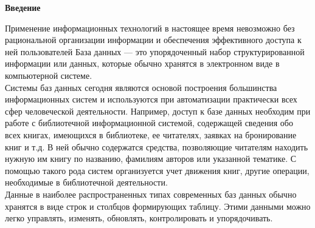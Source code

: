 \begin{flushleft}
    \setlength{\parindent}{14pt}
    \hspace*{10pt}
    \begin{center}
        \textbf{Введение}
    \end{center}
    \vspace*{14pt}

    Применение информационных технологий в настоящее время невозможно без рациональной 
    организации информации и обеспечения эффективного доступа к ней пользователей    
    База данных — это упорядоченный набор структурированной информации или данных, 
    которые обычно хранятся в электронном виде в компьютерной системе. \\

    Системы баз данных сегодня являются основой построения большинства информационных 
    систем и используются при автоматизации практически всех сфер человеческой деятельности. 
    Например, доступ к базе данных необходим при работе с библиотечной информационной
    системой, содержащей сведения обо всех книгах, имеющихся в библиотеке, ее читателях, 
    заявках на бронирование книг и т.д. В ней обычно содержатся средства, позволяющие 
    читателям находить нужную им книгу по названию, фамилиям авторов или указанной 
    тематике. С помощью такого рода систем организуется учет движения книг, другие операции, 
    необходимые в библиотечной деятельности.\\

    Данные в наиболее распространенных типах современных баз данных обычно 
    хранятся в виде строк и столбцов формирующих таблицу. Этими данными можно 
    легко управлять, изменять, обновлять, контролировать и упорядочивать.\\


\end{flushleft}

